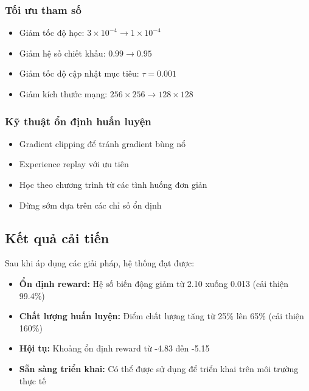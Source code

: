 \subsubsection{Tối ưu tham số}
\begin{itemize}
    \item Giảm tốc độ học: $3 \times 10^{-4}\rightarrow 1 \times 10^{-4}$

    \item Giảm hệ số chiết khấu: $0.99 \rightarrow 0.95$

    \item Giảm tốc độ cập nhật mục tiêu: $\tau = 0.001$

    \item Giảm kích thước mạng: $256 \times 256 \rightarrow 128 \times 128$
\end{itemize}

\subsubsection{Kỹ thuật ổn định huấn luyện}
\begin{itemize}
    \item Gradient clipping để tránh gradient bùng nổ

    \item Experience replay với ưu tiên

    \item Học theo chương trình từ các tình huống đơn giản

    \item Dừng sớm dựa trên các chỉ số ổn định
\end{itemize}

\subsection{Kết quả cải tiến}
Sau khi áp dụng các giải pháp, hệ thống đạt được:
\begin{itemize}
    \item \textbf{Ổn định reward:} Hệ số biến động giảm từ 2.10 xuống
        0.013 (cải thiện 99.4\%)

    \item \textbf{Chất lượng huấn luyện:} Điểm chất lượng tăng từ 25\% lên 65\% (cải thiện 160\%)

    \item \textbf{Hội tụ:} Khoảng ổn định reward từ -4.83 đến -5.15

    \item \textbf{Sẵn sàng triển khai:} Có thể được sử dụng để triển khai trên môi trường thực tế
\end{itemize}